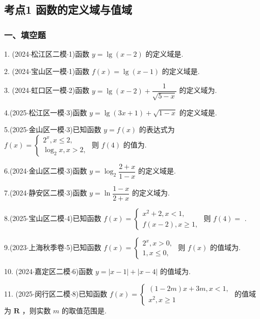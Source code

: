 \subsection*{考点1 函数的定义域与值域}

\subsubsection*{一、填空题}

1. (2024$\cdot$松江区二模$\cdot$1)函数 $y = \lg \left( {x - 2}\right)$ 的定义域是\blkda[2]{}.

2. (2024$\cdot$宝山区一模$\cdot$1)函数 $f\left( x\right)  = \lg \left( {x - 1}\right)$ 的定义域是\blkda[2]{}.

3. (2024$\cdot$虹口区一模$\cdot$2)函数 $y = \lg \left( {x - 2}\right)  + \dfrac{1}{\sqrt{5 - x}}$ 的定义域为\blkda[2]{}.

4.(2025$\cdot$松江区一模$\cdot$3)函数 $y = \lg \left( {{3x} + 1}\right)  + \sqrt{1 - x}$ 的定义域是\blkda[2]{}.

5.(2025$\cdot$金山区一模$\cdot$3)已知函数 $y = f\left( x\right)$ 的表达式为 $f\left( x\right)  = \left\{  \begin{array}{l} {2}^{x},x \leq  2, \\  {\log }_{2}x,x > 2, \end{array}\right.$ 则 $f\left( 4\right)$ 的值为\blkda[2]{}.

6.(2024$\cdot$金山区二模$\cdot$3)函数 $y = {\log }_{2}\dfrac{2 + x}{1 - x}$ 的定义域是\blkda[2]{}.

7.(2024$\cdot$静安区二模$\cdot$3)函数 $y = \ln \dfrac{1 - x}{2 + x}$ 的定义域为\blkda[2]{}.

8.(2025$\cdot$宝山区二模$\cdot$4)已知函数 $f\left( x\right)  = \left\{  \begin{array}{l} {x}^{2} + 2,x < 1, \\  f\left( {x - 2}\right) ,x \geq  1, \end{array}\right.$ 则 $f\left( 4\right)  =$ \blkda[2]{}.

9.(2023$\cdot$上海秋季卷$\cdot$5)已知函数 $f\left( x\right)  = \left\{  \begin{array}{l} {2}^{x},x > 0, \\  1,x \leq  0, \end{array}\right.$ 则 $f\left( x\right)$ 的值域为\blkda[2]{}.

10. (2024$\cdot$嘉定区二模$\cdot$6)函数 $y = \left| {x - 1}\right|  + \left| {x - 4}\right|$ 的值域为\blkda[2]{}.

11. (2025$\cdot$闵行区二模$\cdot$8)已知函数 $f\left( x\right)  = \left\{  \begin{array}{l} \left( {1 - {2m}}\right) x + {3m},x < 1, \\  {x}^{2},x \geq  1 \end{array}\right.$ 的值域为 $\mathbf{R}$ ，则实数 $m$ 的取值范围是\blkda[2]{}.

